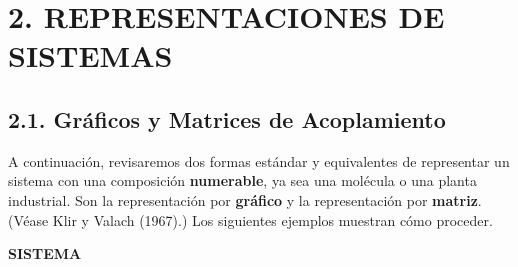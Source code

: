 {\section*{\textbf{2. REPRESENTACIONES DE SISTEMAS}}

\subsection*{2.1. Gráficos y Matrices de Acoplamiento}
A continuación, revisaremos dos formas estándar y equivalentes de representar un sistema con una composición \textbf{numerable}, ya sea una molécula o una planta industrial. Son la representación por \textbf{gráfico} y la representación por \textbf{matriz}. (Véase Klir y Valach (1967).) Los siguientes ejemplos muestran cómo proceder.
}

\newpage
\fancyhf{}
\fancyhead[r]{\thepage} 
\begin{center}
{\fontsize{13}{16}\selectfont \textbf{SISTEMA}}
\end{center}
\vspace{0.5cm}

